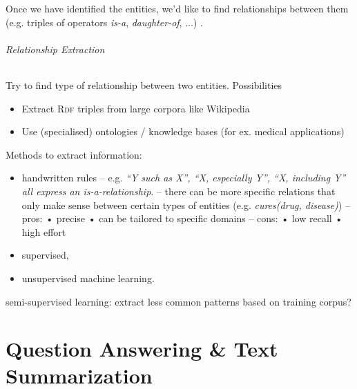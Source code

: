 \documentclass[10pt,twocolumn]{article}
\begin{document}
Once we have identified the entities, we'd like to find relationships between
them (e.g. triples of operators \textit{is-a}, \textit{daughter-of}, ...)
.

\paragraph{\textit{Relationship Extraction}} Try to find type of relationship
between two entities. Possibilities
\begin{itemize}
\item Extract \textsc{Rdf} triples from large corpora like Wikipedia
\item Use (specialised) ontologies / knowledge bases (for ex. medical applications)
\end{itemize}
Methods to extract information:
\begin{itemize}
\item handwritten rules -- e.g. \textit{``Y such as X'', ``X, especially Y'',
    ``X, including Y'' all express an \textit{is-a}-relationship}. -- there can
  be more specific relations that only make sense between certain types of
  entities (e.g. \textit{cures(drug, disease)}) -- pros:  • precise  • can be
  tailored to specific domains -- cons:  • low recall  • high effort
\item supervised,
\item unsupervised machine learning.
\end{itemize}

semi-supervised learning: extract less common patterns based on training corpus?






\pagebreak
\part{Question Answering \& Text Summarization}
\end{document}

